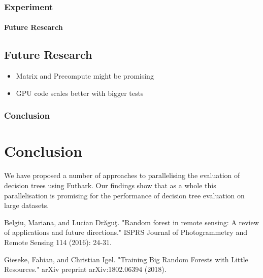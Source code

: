 \documentclass[12pt,t]{beamer}
\begin{document}
\begin{frame}
  \frametitle{Experiment}
  \framesubtitle{Future Research}
\subsection{Future Research}

\begin{itemize}
  \item Matrix and Precompute might be promising
  \item GPU code scales better with bigger tests
\end{itemize}



%
%


\end{frame}
\begin{frame}
  \frametitle{Conclusion}
\section{Conclusion}

We have proposed a number of approaches to parallelising the evaluation of decision trees using Futhark. Our findings show that as a whole this parallelisation is promising for the performance of decision tree evaluation on large datasets.

\end{frame}

\begin{thebibliography}{}

Belgiu, Mariana, and Lucian Drăguţ. "Random forest in remote sensing: A review of applications and future directions." ISPRS Journal of Photogrammetry and Remote Sensing 114 (2016): 24-31.

Gieseke, Fabian, and Christian Igel. "Training Big Random Forests with Little Resources." arXiv preprint arXiv:1802.06394 (2018).

\end{thebibliography}
\end{document}
